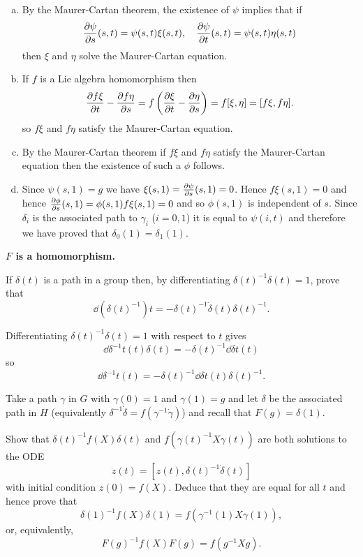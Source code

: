 \documentclass[12pt]{article}
\begin{document}
\begin{answer}
\begin{enumerate}[(a)]
\item
By the Maurer-Cartan theorem, the existence of $\psi$ implies that if
\[\frac{\partial \psi}{\partial s}(s,t)=\psi(s,t)\xi(s,t),\quad\frac{\partial \psi}{\partial t}(s,t)=\psi(s,t)\eta(s,t)\]
then $\xi$ and $\eta$ solve the Maurer-Cartan equation.
\item If $f$ is a Lie algebra homomorphism then
\[\frac{\partial f\xi}{\partial t}-\frac{\partial f\eta}{\partial s}=f\left(\frac{\partial \xi}{\partial t}-\frac{\partial \eta}{\partial s}\right)=f[\xi,\eta]=[f\xi,f\eta].\]
so $f\xi$ and $f\eta$ satisfy the Maurer-Cartan equation.
\item By the Maurer-Cartan theorem if $f\xi$ and $f\eta$ satisfy the Maurer-Cartan equation then the existence of such a $\phi$ follows.
\item Since $\psi(s,1)=g$ we have $\xi(s,1)=\frac{\partial \psi}{\partial s}(s,1)=0$. Hence $f\xi(s,1)=0$ and hence $\frac{\partial \phi}{\partial s}(s,1)=\phi(s,1)f\xi(s,1)=0$ and so $\phi(s,1)$ is independent of $s$. Since $\delta_i$ is the associated path to $\gamma_i$ ($i=0,1$) it is equal to $\psi(i,t)$ and therefore we have proved that $\delta_0(1)=\delta_1(1)$.
\end{enumerate}
\end{answer}

\newpage

{\bf $F$ is a homomorphism.}

\begin{question}
If $\delta(t)$ is a path in a group then, by differentiating $\delta(t)^{-1}\delta(t)=1$, prove that
\[\dd{(\delta(t)^{-1})}{t}=-\delta(t)^{-1}\dot{\delta}(t)\delta(t)^{-1}.\]
\end{question}

\begin{answer}
Differentiating $\delta(t)^{-1}\delta(t)=1$ with respect to $t$ gives
\[\dd{\delta^{-1}}{t}(t)\delta(t)=-\delta(t)^{-1}\dd{\delta}{t}(t)\]
so
\[\dd{\delta^{-1}}{t}(t)=-\delta(t)^{-1}\dd{\delta}{t}(t)\delta(t)^{-1}.\]
\end{answer}

Take a path $\gamma$ in $G$ with $\gamma(0)=1$ and $\gamma(1)=g$ and let $\delta$ be the associated path in $H$ (equivalently $\delta^{-1}\dot{\delta}=f(\gamma^{-1}\dot{\gamma})$) and recall that $F(g)=\delta(1)$.

\begin{question}\label{qun:intertwined}
Show that $\delta(t)^{-1}f(X)\delta(t)$ and $f(\gamma(t)^{-1}X\gamma(t))$ are both solutions to the ODE
\[\dot{z}(t)=[z(t),\delta(t)^{-1}\dot{\delta}(t)]\]
with initial condition $z(0)=f(X)$. Deduce that they are equal for all $t$ and hence prove that
\[\delta(1)^{-1}f(X)\delta(1)=f(\gamma^{-1}(1)X\gamma(1)),\]
or, equivalently,
\[F(g)^{-1}f(X)F(g)=f(g^{-1}Xg).\]
\end{question}
\end{document}
